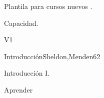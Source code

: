 
\begin{syllabus}


\begin{justification}
   Plantila para cursos nuevos .
   \end{justification}
   
   \begin{goals}
   \item Capacidad.
   \end{goals}
   
   \begin{outcomes}{V1}
      \item {}
   \end{outcomes}
   
   \begin{unit}{Introducción}{}{Sheldon,Menden}{6}{2}
   \begin{topics}
         \item Introducción I.
      \end{topics}
   
      \begin{learningoutcomes}
         \item Aprender
      \end{learningoutcomes}
   \end{unit}
   
   
   
   
   
   
   \begin{coursebibliography}
   \end{coursebibliography}
   
   \end{syllabus}
   